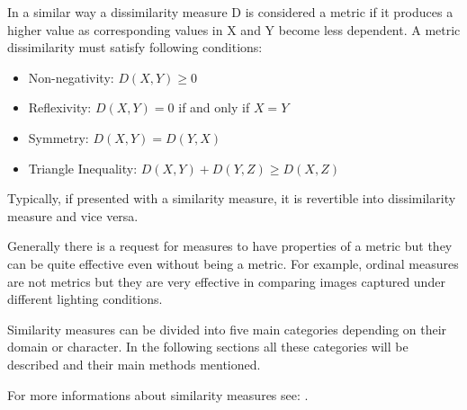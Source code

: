 In a similar way a dissimilarity measure D is considered a metric if it produces a higher value as corresponding values in X and Y become less dependent. A metric dissimilarity must satisfy following conditions:
\begin{itemize}
\item Non-negativity: $D(X,Y) \geq 0$
\item Reflexivity: $D(X,Y) = 0$ if and only if $X = Y$
\item Symmetry: $D(X,Y) = D(Y,X)$
\item Triangle Inequality: $D(X,Y) + D(Y,Z) \geq D(X,Z)$
\end{itemize}

Typically, if presented with a similarity measure, it is revertible into dissimilarity measure and vice versa.

Generally there is a request for measures to have properties of a metric but they can be quite effective even without being a metric. For example, ordinal measures are not metrics but they are very effective in comparing images captured under different lighting conditions.\cite{simMeasuresLecture}

Similarity measures can be divided into five main categories depending on their domain or character. In the following sections all these categories will be described and their main methods mentioned.

For more informations about similarity measures see: \cite{clusteringSimMeasure} \cite{simDissim} \cite{simMeasuresLecture}.

